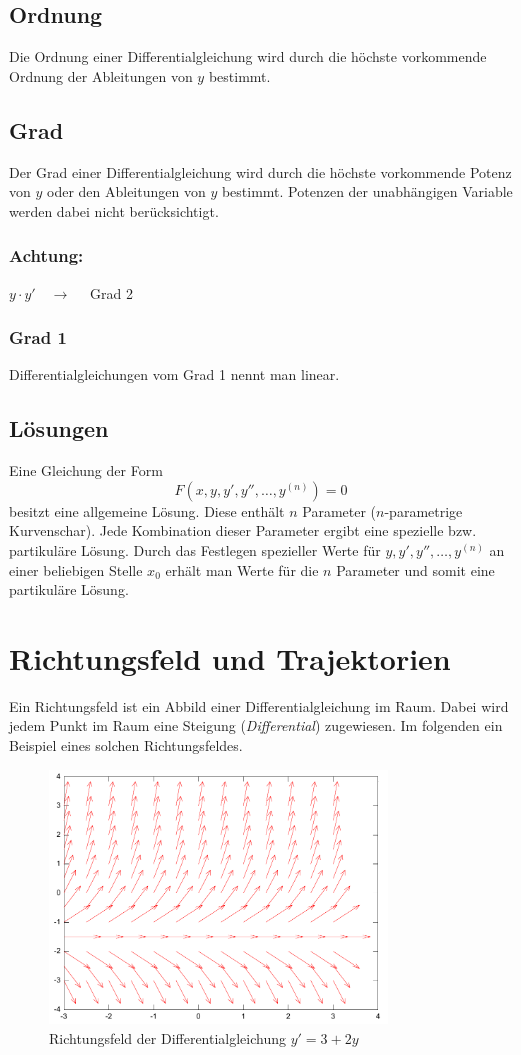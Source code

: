 \subsection{Ordnung}
Die Ordnung einer Differentialgleichung wird durch die höchste vorkommende 
Ordnung der Ableitungen von $y$ bestimmt. 

\subsection{Grad}
Der Grad einer Differentialgleichung wird durch die höchste vorkommende Potenz 
von $y$ oder den Ableitungen von $y$ bestimmt. Potenzen der unabhängigen 
Variable werden dabei nicht berücksichtigt. 
\subsubsection*{Achtung:}
$y \cdot y' \quad \rightarrow \quad$ Grad 2

\subsubsection{Grad 1}
Differentialgleichungen vom Grad 1 nennt man linear. 

\subsection{Lösungen}
Eine Gleichung der Form
\[ F(x, y, y', y'', \ldots, y^{(n)})=0 \]
besitzt eine allgemeine Lösung. Diese enthält $n$ Parameter ($n$-parametrige 
Kurvenschar). Jede Kombination dieser Parameter ergibt eine spezielle bzw. 
partikuläre Lösung. Durch das Festlegen spezieller Werte für 
$y, y', y'', \ldots, y^{(n)}$ an einer beliebigen Stelle $x_0$ erhält man Werte 
für die $n$ Parameter und somit eine partikuläre Lösung. 

\section{Richtungsfeld und Trajektorien}
Ein Richtungsfeld ist ein Abbild einer Differentialgleichung im Raum.
Dabei wird jedem Punkt im Raum eine Steigung (\emph{Differential})
zugewiesen. Im folgenden ein Beispiel eines solchen Richtungsfeldes.

\begin{figure}[h!]
	\centering
	\includegraphics[width=0.8\textwidth]{field.pdf}
	\caption{Richtungsfeld der Differentialgleichung $y'=3+2y$}
\end{figure}

